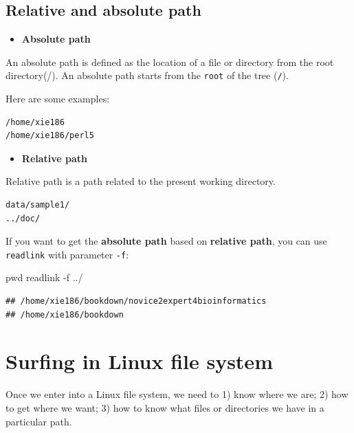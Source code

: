 \documentclass[]{book}
\makeatletter
\newenvironment{Shaded}{\begin{snugshade}}{\end{snugshade}}
\newcommand{\FunctionTok}[1]{\textcolor[rgb]{0.00,0.00,0.00}{#1}}
\newcommand{\BuiltInTok}[1]{#1}
\newcommand{\NormalTok}[1]{#1}
\providecommand{\tightlist}{%
  \setlength{\itemsep}{0pt}\setlength{\parskip}{0pt}}
\newenvironment{kframe}{%
\medskip{}
\setlength{\fboxsep}{.8em}
 \def\at@end@of@kframe{}%
 \ifinner\ifhmode%
  \def\at@end@of@kframe{\end{minipage}}%
  \begin{minipage}{\columnwidth}%
 \fi\fi%
 \def\FrameCommand##1{\hskip\@totalleftmargin \hskip-\fboxsep
 \colorbox{shadecolor}{##1}\hskip-\fboxsep
     \hskip-\linewidth \hskip-\@totalleftmargin \hskip\columnwidth}%
 \MakeFramed {\advance\hsize-\width
   \@totalleftmargin\z@ \linewidth\hsize
   \@setminipage}}%
 {\par\unskip\endMakeFramed%
 \at@end@of@kframe}
\renewenvironment{Shaded}{\begin{kframe}}{\end{kframe}}
\theoremstyle{definition}
\theoremstyle{definition}
\theoremstyle{definition}
\theoremstyle{remark}
\makeatother
\begin{document}
\subsection{Relative and absolute
path}\label{relative-and-absolute-path}

\begin{itemize}
\tightlist
\item
  \textbf{Absolute path}
\end{itemize}

An absolute path is defined as the location of a file or directory from
the root directory(/). An absolute path starts from the \texttt{root} of
the tree (\texttt{/}).

Here are some examples:

\begin{verbatim}
/home/xie186
/home/xie186/perl5
\end{verbatim}

\begin{itemize}
\tightlist
\item
  \textbf{Relative path}
\end{itemize}

Relative path is a path related to the present working directory.

\begin{verbatim}
data/sample1/
../doc/
\end{verbatim}

If you want to get the \textbf{absolute path} based on \textbf{relative
path}, you can use \texttt{readlink} with parameter \texttt{-f}:

\begin{Shaded}
\begin{Highlighting}[]
\BuiltInTok{pwd}
\FunctionTok{readlink}\NormalTok{ -f ../}
\end{Highlighting}
\end{Shaded}

\begin{verbatim}
## /home/xie186/bookdown/novice2expert4bioinformatics
## /home/xie186/bookdown
\end{verbatim}

\section{Surfing in Linux file
system}\label{surfing-in-linux-file-system}

Once we enter into a Linux file system, we need to 1) know where we are;
2) how to get where we want; 3) how to know what files or directories we
have in a particular path.
\end{document}
